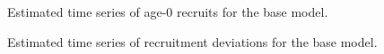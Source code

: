 \documentclass[
]{scrartcl}
\begin{document}
\begin{figure}[H]


\caption{\label{fig-recruits}Estimated time series of age-0 recruits for
the base model.}

\end{figure}%

\pagebreak

\begin{figure}[H]


\caption{\label{fig-recdevs}Estimated time series of recruitment
deviations for the base model.}

\end{figure}%
\end{document}
